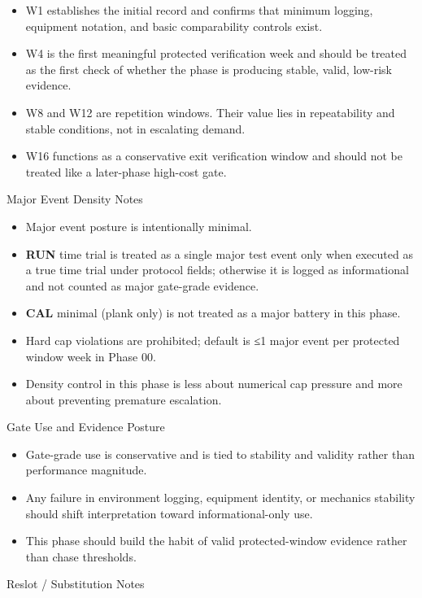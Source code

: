 \documentclass[10pt]{article}
\begin{document}
\begin{itemize}
\item W1 establishes the initial record and confirms that minimum logging, equipment notation, and basic comparability controls exist.
\item W4 is the first meaningful protected verification week and should be treated as the first check of whether the phase is producing stable, valid, low-risk evidence.
\item W8 and W12 are repetition windows. Their value lies in repeatability and stable conditions, not in escalating demand.
\item W16 functions as a conservative exit verification window and should not be treated like a later-phase high-cost gate.
\end{itemize}

Major Event Density Notes

\begin{itemize}
\item Major event posture is intentionally minimal.
\item \textbf{RUN} time trial is treated as a single major test event only when executed as a true time trial under protocol fields; otherwise it is logged as informational and not counted as major gate-grade evidence.
\item \textbf{CAL} minimal (plank only) is not treated as a major battery in this phase.
\item Hard cap violations are prohibited; default is ≤1 major event per protected window week in Phase 00.
\item Density control in this phase is less about numerical cap pressure and more about preventing premature escalation.
\end{itemize}

Gate Use and Evidence Posture

\begin{itemize}
\item Gate-grade use is conservative and is tied to stability and validity rather than performance magnitude.
\item Any failure in environment logging, equipment identity, or mechanics stability should shift interpretation toward informational-only use.
\item This phase should build the habit of valid protected-window evidence rather than chase thresholds.
\end{itemize}

Reslot / Substitution Notes
\end{document}

